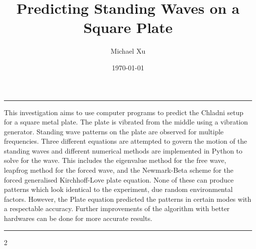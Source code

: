 \documentclass[10pt, letterpaper]{article}
\title{Predicting Standing Waves on a Square Plate}
\author{Michael Xu}
\date{\today}
\begin{document}
\maketitle

\abstract
\noindent\rule{\linewidth}{0.4pt}

This investigation aims to use computer programs to predict the Chladni setup for a square metal plate. The plate is vibrated from the middle using a vibration generator. Standing wave patterns on the plate are observed for multiple frequencies. Three different equations are attempted to govern the motion of the standing waves and different numerical methods are implemented in Python to solve for the wave. This includes the eigenvalue method for the free wave, leapfrog method for the forced wave, and the Newmark-Beta scheme for the forced generalised Kirchhoff-Love plate equation. None of these can produce patterns which look identical to the experiment, due random environmental factors. However, the Plate equation predicted the patterns in certain modes with a respectable accuracy. Further improvements of the algorithm with better hardwares can be done for more accurate results.

\noindent\rule{\linewidth}{0.4pt}

\begin{multicols}{2}
    
    
    
    
    
    
    
\end{multicols}

\printbibliography
\clearpage
\appendix
\renewcommand{\thesection}{Appendix \Alph{section}}




\end{document}
